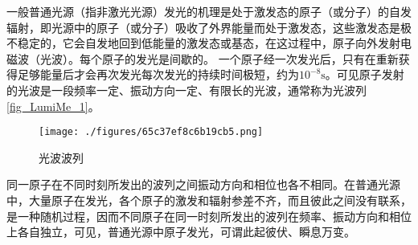 
一般普通光源（指非激光光源）发光的机理是处于激发态的原子（或分子）的自发辐射，即光源中的原子（或分子）吸收了外界能量而处于激发态，这些激发态是极不稳定的，它会自发地回到低能量的激发态或基态，在这过程中，原子向外发射电磁波（光波）。每个原子的发光是间歇的。 一个原子经一次发光后，只有在重新获得足够能量后才会再次发光每次发光的持续时间极短，约为$10^{-8}\mathrm s$。可见原子发射的光波是一段频率一定、振动方向一定、有限长的光波，通常称为光波列\autoref{fig_LumiMe_1}。
\begin{figure}[ht]
\centering
\texttt{[image: ./figures/65c37ef8c6b19cb5.png]}
\caption{光波波列} \label{fig_LumiMe_1}
\end{figure}

同一原子在不同时刻所发出的波列之间振动方向和相位也各不相同。在普通光源中，大量原子在发光，各个原子的激发和辐射参差不齐，而且彼此之间没有联系，是一种随机过程，因而不同原子在同一时刻所发出的波列在频率、振动方向和相位上各自独立，可见，普通光源中原子发光，可谓此起彼伏、瞬息万变。